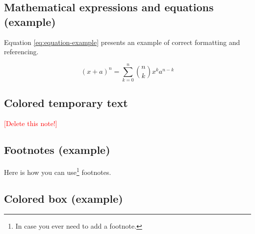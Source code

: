 \subsection{Mathematical expressions and equations (example)}

Equation \ref{eq:equation-example} presents an example of correct
formatting and referencing.

\begin{equation} \label{eq:equation-example}
  (x+a)^n = \sum_{k=0}^{n} {n \choose k} x^ka^{n-k}
\end{equation}


\subsection{Colored temporary text}

\textcolor{red}{[Delete this note!]}

\subsection{Footnotes (example)}

Here is how you can use\footnote{In case you ever need to add a footnote.} footnotes.

\subsection{Colored box (example)}

\begin{tcolorbox}[arc=0pt, outer arc=0pt, boxrule=0pt, left=0mm]
\blindtext
\end{tcolorbox}


